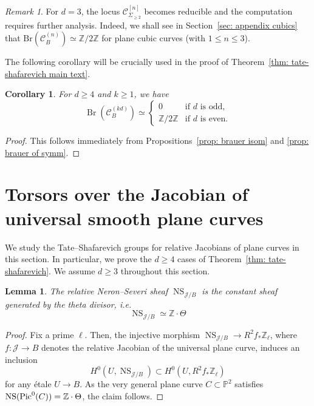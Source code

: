 \documentclass[11pt]{amsart}
\theoremstyle{plain}
\newtheorem{cor}[thm]{Corollary}
\newtheorem{lem}[thm]{Lemma}
\theoremstyle{definition}
\theoremstyle{remark}
\newtheorem{rmk}[thm]{Remark}
\DeclareMathOperator{\Br}{Br}
\newcommand{\Pic}{\mathop{\rm Pic}\nolimits}
\DeclareMathOperator{\NS}{NS}
\begin{document}
\begin{rmk}
    For $d=3$, the locus $\mathcal{C}_{\Sigma_{\geq 2}}^{[n]}$ becomes reducible and the computation requires further analysis. Indeed, we shall see in Section~\ref{sec: appendix cubics} that $\mathrm{Br}(\mathcal{C}_B^{(n)}) \simeq \mathbb Z/2\mathbb Z$ for plane cubic curves (with $1\leq n\leq 3$).
\end{rmk}

The following corollary will be crucially used in the proof of Theorem~\ref{thm: tate-shafarevich main text}.

\begin{cor} \label{cor: brauer of symm}
    For $d\geq 4$ and $k\geq 1$, we have 
    \[
    \Br(\mathcal C_B^{(kd)}) \simeq \begin{cases}0 & \text{if } d \text{ is odd,} \\
    \mathbb Z / 2 \mathbb Z &\text{if } d \text{ is even.}\end{cases}
    \]
\end{cor}

\begin{proof}
    This follows immediately from Propositions~\ref{prop: brauer isom} and \ref{prop: brauer of symm}.
\end{proof}

\section{Torsors over the Jacobian of universal smooth plane curves} \label{sec: torsors over Jacobian}

We study the Tate--Shafarevich groups for relative Jacobians of plane curves in this section. In particular, we prove the $d\geq 4$ cases of Theorem~\ref{thm: tate-shafarevich}. We assume $d\geq 3$ throughout this section.

\begin{lem}\label{lem: desc ns}
The relative Neron--Severi sheaf $\NS_{\mathcal{J}/B}$ is the constant sheaf generated by the theta divisor, i.e.
$$\NS_{\mathcal{J}/B} \simeq \mathbb Z \cdot \Theta$$
\end{lem}
\begin{proof}
Fix a prime $\ell$. Then, the injective morphism $\NS_{\mathcal{J}/B} \to R^2f_* \mathbb Z_\ell$, where $f \colon \mathcal J \to B$ denotes the relative Jacobian of the universal plane curve, induces an inclusion
$$H^0(U, \NS_{\mathcal{J}/B}) \subset H^0(U, R^2f_* \mathbb Z_\ell)$$
for any \'etale $U \to B$.
As the very general plane curve $C \subset \mathbb P^2$ satisfies $\NS(\Pic^0(C)) = \mathbb Z \cdot \Theta$, the claim follows.
\end{proof}
\end{document}

